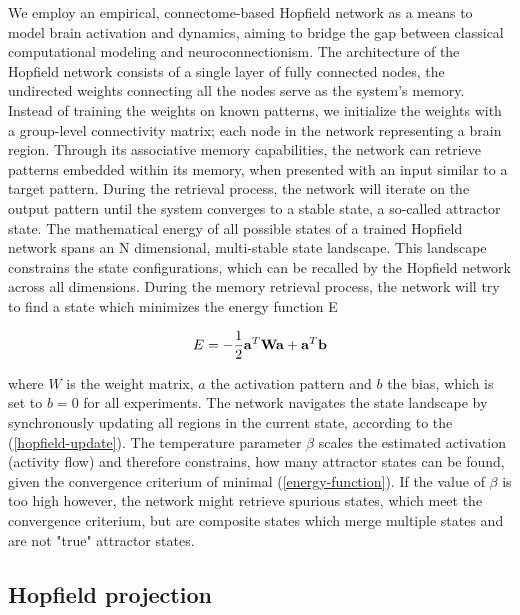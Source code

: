 \documentclass{article}
\begin{document}
We employ an empirical, connectome-based Hopfield network as a means to model brain activation and dynamics, aiming to
bridge the gap between classical computational modeling and neuroconnectionism. The architecture of the Hopfield network
\citep{hopfield1982neural} consists of a single layer of fully connected nodes, the undirected weights connecting
all the nodes serve as the system's memory.
Instead of training the weights on known patterns, we initialize the weights with a group-level
connectivity matrix; each node in the network representing a brain region. Through its associative memory capabilities,
the network can retrieve patterns embedded within its memory, when presented with an input similar to a target
pattern. During the retrieval process, the network will iterate on the output pattern until the system converges to a
stable state, a so-called attractor state. The mathematical energy of all possible states of a trained Hopfield network
spans an N dimensional, multi-stable state landscape. This landscape constrains the state configurations, which can be
recalled by the Hopfield network across all dimensions. During the memory retrieval process, the network will try to
find a state which minimizes the energy function E

\begin{equation}
\label{energy-function}
E = - \frac{1}{2}  \bold{a}^{T} \bold{W} \bold{a} + \bold{a}^{T}\bold{b}
\end{equation}

where $W$ is the weight matrix, $a$ the activation pattern and $b$ the bias, which is set to $b = 0$ for all experiments.
The network navigates the state landscape by synchronously updating all regions in the current state, according to the
(\ref{hopfield-update}). The temperature parameter $\beta$ scales the estimated activation (activity flow)
\citep{cole2016activity}and therefore constrains, how many attractor states can be found, given the convergence
criterium of minimal (\ref{energy-function}).
If the value of $\beta$ is too high however, the network might retrieve spurious states,
which meet the convergence criterium, but are composite states which merge multiple states and are not "true"
attractor states.

\subsection{Hopfield projection}\label{Hopfield projection}
\end{document}
